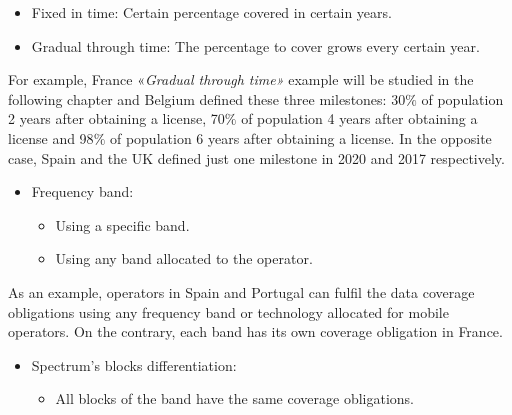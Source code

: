 {\begin{itemize}
\begin{itemize}
	\item Fixed in time: Certain percentage covered in certain years.\par

	\item Gradual through time: The percentage to cover grows every certain year.\par
\end{itemize}
\end{itemize}
For example, France «\textit{Gradual through time»} example will be studied in the following chapter and Belgium defined these three milestones: 30$\%$  of population 2 years after obtaining a license, 70$\%$  of population 4 years after obtaining a license and 98$\%$  of population 6 years after obtaining a license. In the opposite case, Spain and the UK defined just one milestone in 2020 and 2017 respectively.\par

\begin{itemize}
	\item Frequency band:\par

\begin{itemize}
	\item Using a specific band.\par

	\item Using any band allocated to the operator.\par

\end{itemize}
\end{itemize}
As an example, operators in Spain and Portugal can fulfil the data coverage obligations using any frequency band or technology allocated for mobile operators. On the contrary, each band has its own coverage obligation in France.\par


\begin{itemize}
	\item Spectrum’s blocks differentiation:\par

\begin{itemize}
	\item All blocks of the band have the same coverage obligations.\par


\end{itemize}
\end{itemize}}
